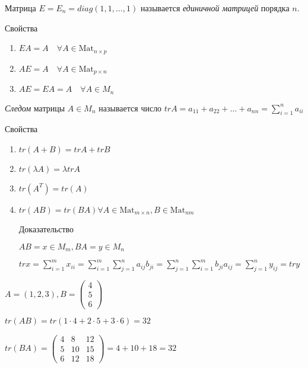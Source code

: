 
\begin{definition}
    Матрица $E = E_n = diag(1, 1, \dots, 1)$ называется \textit{единичной матрицей} порядка $n$. 
\end{definition}

Свойства
\begin{enumerate}
    \item $EA = A \quad \forall A \in \text{Mat}_{n \times p}$
    \item $AE = A \quad \forall A \in \text{Mat}_{p \times n}$
    \item $AE = EA = A \quad \forall A \in M_n$
\end{enumerate}

\begin{definition}
    \textit{Следом} матрицы $A \in M_n$ называется число $trA = a_{11} + a_{22} + \dots + a_{nn} = \sum_{i=1}^n a_{ii}$ 
\end{definition}

Свойства
\begin{enumerate}
\item $tr(A + B) = trA + trB$
\item $tr(\lambda A) = \lambda tr A$
\item $tr(A^T) = tr(A)$
\item $tr(AB) = tr(BA) \forall A \in \text{Mat}_{m \times n}, B \in \text{Mat}_{nm}$

    Доказательство

    $AB = x \in M_m, BA = y \in M_n$

    $tr x = \sum_{i=1}^m x_{ii} = \sum_{i=1}^m \sum_{j=1}^n a_{ij} b_{ji}= \sum_{j=1}^n \sum_{i=1}^m b_{ji} a_{ij} = \sum_{j=1}^n y_{ij} = tr y$
\end{enumerate}

\begin{example}
    $A = (1, 2, 3), B = \begin{pmatrix}4 \\ 5 \\ 6\end{pmatrix}$

    $tr(AB) = tr(1 \cdot 4 + 2 \cdot 5 + 3 \cdot 6) = 32$

    $tr(BA) = \begin{pmatrix} 4 & 8 & 12 \\ 5 & 10 & 15 \\ 6 & 12 & 18 \end{pmatrix} = 4 + 10 + 18 = 32$
\end{example}



